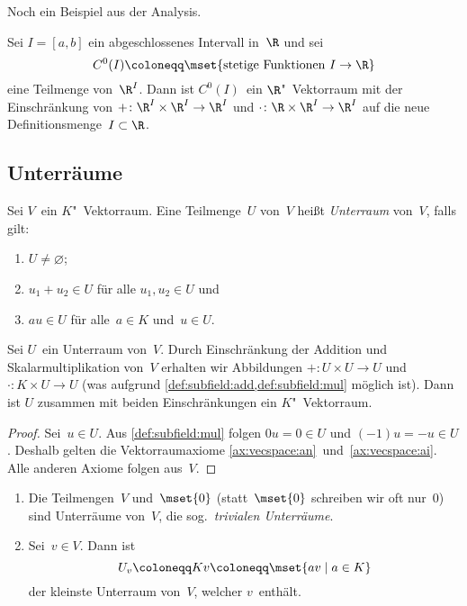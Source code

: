 \documentclass[a4paper]{article}
\begin{document}
Noch ein Beispiel aus der Analysis.

\begin{example}
    Sei $I = [a,b]$ ein abgeschlossenes Intervall in~$\R$ und sei
    \begin{equation*}
        C^0(I) \coloneqq \mset{\text{stetige Funktionen } I \to \R}
    \end{equation*}
    eine Teilmenge von~$\R^I$. Dann ist $C^0(I)$~ein $\R$"~Vektorraum mit der Einschränkung von $+\colon \R^I\times\R^I \to \R^I$ und $\cdot\colon \R\times\R^I \to \R^I$ auf die neue Definitionsmenge~$I \subset \R$.
\end{example}


\subsection{Unterräume}

\begin{definition}
    Sei $V$~ein $K$"~Vektorraum. Eine Teilmenge~$U$ von~$V$ heißt \emph{Unterraum} von~$V$, falls gilt:
    \begin{enumerate}
        \item $U \neq \varnothing$;
        \item $u_1+u_2 \in U$ für alle $u_1,u_2 \in U$ und\label{def:subspace:add}
        \item $au \in U$ für alle~$a \in K$ und~$u \in U$.\label{def:subspace:mul}
    \end{enumerate}
\end{definition}

\begin{lemma}
    Sei $U$~ein Unterraum von~$V$. Durch Einschränkung der Addition und Skalarmultiplikation von~$V$ erhalten wir Abbildungen $+\colon U\times U \to U$ und $\cdot\colon K\times U \to U$ (was aufgrund \cref{def:subfield:add,def:subfield:mul} möglich ist). Dann ist $U$ zusammen mit beiden Einschränkungen ein $K$"~Vektorraum.
\end{lemma}

\begin{proof}
    Sei~$u \in U$. Aus \cref{def:subfield:mul} folgen $0u = 0 \in U$ und $(-1)u = -u \in U$. Deshalb gelten die Vektorraumaxiome \ref{ax:vecspace:an}~und~\ref{ax:vecspace:ai}. Alle anderen Axiome folgen aus~$V$.
\end{proof}

\begin{example}\leavevmode
    \begin{enumerate}
        \item Die Teilmengen~$V$ und~$\mset{0}$ (statt~$\mset{0}$ schreiben wir oft nur~0) sind Unterräume von~$V$, die sog.\ \emph{trivialen Unterräume}.
        \item Sei~$v \in V$. Dann ist
        \begin{equation*}
            U_v \coloneqq Kv \coloneqq \mset{av \mid a \in K}
        \end{equation*}
        der kleinste Unterraum von~$V$, welcher $v$~enthält.
    \end{enumerate}
\end{example}
\end{document}
